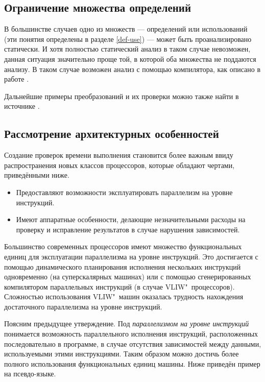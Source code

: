 \subsection{Ограничение множества определений}

В большинстве случаев одно из множеств --- определений или использований (эти понятия определены в разделе \ref{def-use}) --- может быть проанализировано статически. И хотя полностью статический анализ в таком случае невозможен, данная ситуация значительно проще той, в которой оба множества не поддаются анализу. В таком случае возможен анализ с помощью компилятора, как описано в работе \cite{ZuckPFGH02}.

Дальнейшие примеры преобразований и их проверки можно также найти в источнике \cite{ZuckPFGH02}.

\subsection{Рассмотрение архитектурных особенностей}

Создание проверок времени выполнения становится более важным ввиду распространения новых классов процессоров, которые обладают чертами, приведёнными ниже.

\begin{itemize}
	\item Предоставляют возможности эксплуатировать параллелизм на уровне инструкций.
	\item Имеют аппаратные особенности, делающие незначительными расходы на проверку и исправление результатов в случае нарушения зависимостей.
\end{itemize}

Большинство современных процессоров имеют множество функциональных единиц для эксплуатации параллелизма на уровне инструкций. Это достигается с помощью динамического планирования исполнения нескольких инструкций одновременно \cite{dynamic-scheduling} (на суперскалярных машинах) или с помощью сгенерированных компилятором параллельных инструкций \cite{vliw} (в случае VLIW"~процессоров). Сложностью использования VLIW"~машин оказалась трудность нахождения достаточного параллелизма на уровне инструкций.

Поясним предыдущее утверждение. Под \emph{параллелизмом на уровне инструкций} понимается возможность параллельного исполнения инструкций, расположенных последовательно в программе, в случае отсутствия зависимостей между данными, используемыми этими инструкциями. Таким образом можно достичь более полного использования функциональных единиц машины. Ниже приведён пример на псевдо-языке.

